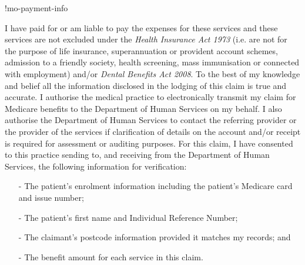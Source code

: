\documentclass[12pt]{article}
\begin{document}
\begin{spacing}{0.3}

\vspace{3mm}
  
  {\footnotesize

    !mo-payment-info} 

 \vspace{3mm}

{\tiny
 
I have paid for or am liable to pay the expenses for these services and these services are not excluded under the \emph{Health Insurance Act 1973} (i.e. are not for the purpose of life insurance, superannuation or provident account schemes, admission to a friendly society, health screening, mass immunisation or connected with employment) and/or \emph{Dental Benefits Act 2008}. To the best of my knowledge and belief all the information disclosed in the lodging of this claim is true and accurate. I authorise the medical practice to electronically transmit my claim for Medicare benefits to the Department of Human Services on my behalf. I also authorise the Department of Human Services to contact the referring provider or the provider of the services if clarification of details on the account and/or receipt is required for assessment or auditing purposes. 
For this claim, I have consented to this practice sending to, and receiving from the Department of Human Services, the following information for verification:

\vspace{1mm}

\begin{itemize}[noitemsep,nolistsep]
  \item[-] The patient’s enrolment information including the patient’s Medicare card and issue number; 
  \item[-] The patient’s first name and Individual Reference Number; 
  \item[-] The claimant’s postcode information provided it matches my records; and 
  \item[-] The benefit amount for each service in this claim.
\end{itemize}

\vspace{1mm}

}
\end{spacing}
\end{document}
